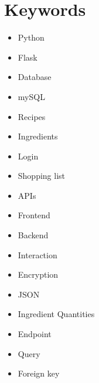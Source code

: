 \documentclass[a4paper,11pt]{article}
\begin{document}
\section*{Keywords}
\begin{multicols}{2}
\begin{itemize}
    \item Python
    \item Flask
    \item Database
    \item mySQL
    \item Recipes
    \item Ingredients
    \item Login
    \item Shopping list
    \item APIs
    \item Frontend
    \item Backend
    \item Interaction
    \item Encryption
    \item JSON
    \item Ingredient Quantities
    \item Endpoint
    \item Query
    \item Foreign key
\end{itemize}
\end{multicols}
\end{document}
